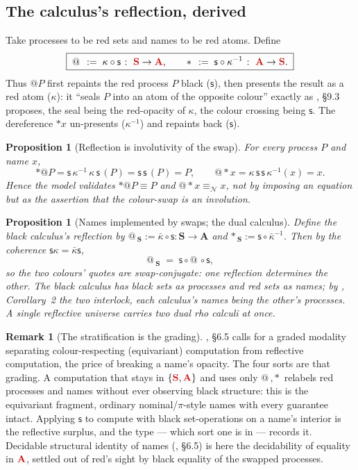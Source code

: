 \documentclass[11pt]{article}
\makeatletter
\newcommand{\rd}[1]{\textcolor{redcopy}{#1}}
\newcommand{\RS}{\rd{\mathbf{S}}}              %
\newcommand{\RA}{\rd{\mathbf{A}}}              %
\newcommand{\BS}{\mathbf{S}}                   %
\newcommand{\BA}{\mathbf{A}}                   %
\newcommand{\swp}{\mathsf{s}}                  %
\newcommand{\kt}{\kappa}                       %
\newcommand{\ktb}{\bar\kappa}                  %
\newcommand{\drp}[1]{{\ast}#1}
\newcommand{\quo}[1]{@#1}
\newcommand{\scong}{\equiv}
\newcommand{\nameq}{\equiv_{\mathcal N}}
\theoremstyle{plain}
\newtheorem{proposition}[theorem]{Proposition}
\theoremstyle{definition}
\newtheorem{remark}[theorem]{Remark}
\makeatother
\begin{document}
\subsection{The calculus's reflection, derived}
Take processes to be red sets and names to be red atoms. Define
\[
  \boxed{\;
    \quo{\,} \;:=\; \kt\circ\swp \;\colon\; \RS \to \RA,
    \qquad
    \drp{\,} \;:=\; \swp\circ\kt^{-1} \;\colon\; \RA \to \RS.
  \;}
\]
Thus $\quo P$ first repaints the red process $P$ black ($\swp$), then presents the
result as a red atom ($\kt$): it ``seals $P$ into an atom of the opposite colour''
exactly as \cite{knot}, \S9.3 proposes, the seal being the red-opacity of $\kt$,
the colour crossing being $\swp$. The dereference $\drp x$ un-presents
($\kt^{-1}$) and repaints back ($\swp$).

\begin{proposition}[Reflection is involutivity of the swap]\label{prop:reflection}
For every process $P$ and name $x$,
\[
  \drp{\quo P}
   = \swp\,\kt^{-1}\,\kt\,\swp\,(P)
   = \swp\,\swp\,(P) = P,
  \qquad
  \quo{\drp x}
   = \kt\,\swp\,\swp\,\kt^{-1}(x)
   = x.
\]
Hence the model validates $\drp{\quo P}\scong P$ and $\quo{\drp x}\nameq x$, not by
imposing an equation but as the assertion that the colour-swap is an involution.
\end{proposition}

\begin{proposition}[Names implemented by swaps; the dual calculus]\label{prop:dual}
Define the black calculus's reflection by $\quo{\,}_{\!\BS}:=\ktb\circ\swp\colon
\BS\to\BA$ and $\drp{\,}_{\!\BS}:=\swp\circ\ktb^{-1}$. Then by the coherence
$\swp\kt=\ktb\swp$,
\[
  \quo{\,}_{\!\BS} \;=\; \swp\circ\quo{\,}\circ\swp,
\]
so the two colours' quotes are swap-conjugate: one reflection determines the
other. The black calculus has black sets as processes and red sets as names; by
\cite{knot}, Corollary~2 the two interlock, each calculus's names being the
other's processes. A single reflective universe carries two dual rho calculi at
once.
\end{proposition}

\begin{remark}[The stratification is the grading]\label{rem:grading}
\cite{knot}, \S6.5 calls for a graded modality separating colour-respecting
(equivariant) computation from reflective computation, the price of breaking a
name's opacity. The four sorts are that grading. A computation that stays in
$\{\RS,\RA\}$ and uses only $\quo{\,},\drp{\,}$ relabels red processes and names
without ever observing black structure: this is the equivariant fragment, ordinary
nominal/$\pi$-style names with every guarantee intact. Applying $\swp$ to compute
with black set-operations on a name's interior is the reflective surplus, and the
type --- which sort one is in --- records it. Decidable structural identity of
names (\cite{knot}, \S6.5) is here the decidability of equality in $\RA$, settled
out of red's sight by black equality of the swapped processes.
\end{remark}
\end{document}
